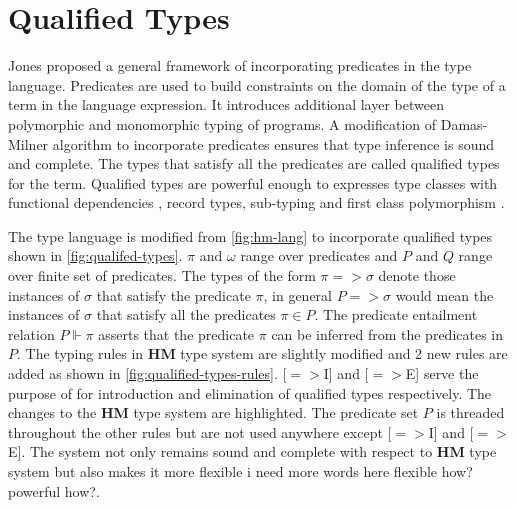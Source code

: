 \section{Qualified Types}\label{sec:qualified-types}
Jones \citeyearpar{jones_theory_1994} proposed a general framework of incorporating predicates in the type language.
Predicates are used to build constraints on the domain of the type of a term in the language expression.
It introduces additional layer between polymorphic and monomorphic typing of programs.
A modification of Damas-Milner algorithm to incorporate predicates ensures that type inference
is sound and complete. The types that satisfy all the predicates are called qualified types for the term.
Qualified types are powerful enough to expresses type classes with functional dependencies \citep{mark_type_2000},
record types, sub-typing \citep{jones_theory_1994} and first class polymorphism \citep{jones_first-class_1997}.

The type language is modified from \cref{fig:hm-lang} to incorporate
qualified types shown in \cref{fig:qualifed-types}. $\pi$ and $\omega$ range over predicates and  $P$ and $Q$ range over finite set of predicates.
The types of the form $\pi => \sigma$ denote those instances of $\sigma$ that satisfy the predicate $\pi$, in general
$P => \sigma$ would mean the instances of $\sigma$ that satisfy all the predicates $\pi \in P$. The predicate entailment
relation $P \Vdash \pi$ asserts that the predicate $\pi$ can be inferred from the predicates in $P$.
The typing rules in \textbf{HM} type system are slightly modified and 2 new rules are added
as shown in \cref{fig:qualified-types-rules}. [$=>$I] and [$=>$E] serve the purpose of for introduction and elimination of qualified types respectively.
The changes to the \textbf{HM} type system are \colorbox{blue!30}{highlighted}. The predicate set $P$ is threaded throughout the other rules
but are not used anywhere except [$=>$I] and [$=>$E]. The system not only remains sound and complete with respect to \textbf{HM} type system but
also makes it more flexible {\color{red} i need more words here flexible how? powerful how?}.

